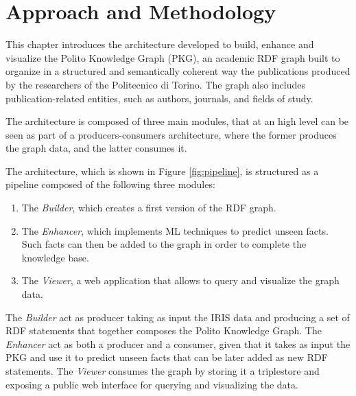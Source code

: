 \documentclass[%
    corpo=13.5pt,
    twoside,
    oldstyle,
    tipotesi=magistrale,
    greek,
    evenboxes
]{toptesi}
\begin{document}
\chapter{Approach and Methodology}
\label{ch:approach}

This chapter introduces the architecture developed to build, enhance
and visualize the Polito Knowledge Graph (PKG), an academic RDF graph
built to organize in a structured and semantically coherent way the publications
produced by the researchers of the Politecnico di Torino. The graph
also includes publication-related entities, such as authors, journals,
and fields of study.

The architecture is composed of three main modules, that at an high level
can be seen as part of a producers-consumers architecture, where the former
produces the graph data, and the latter consumes it.

The architecture, which is shown in Figure \ref{fig:pipeline}, is structured
as a pipeline composed of the following three modules:

\begin{enumerate}
    \item The \emph{Builder}, which creates a first version of the
    RDF graph.
    \item The \emph{Enhancer}, which implements ML techniques to predict
    unseen facts. Such facts can then be added to the graph in order to
    complete the knowledge base.
    \item The \emph{Viewer}, a web application that allows to query
    and visualize the graph data.
\end{enumerate}

The \emph{Builder} act as producer taking as input the IRIS data
and producing a set of RDF statements that together composes the
Polito Knowledge Graph.
The \emph{Enhancer} act as both a producer and a consumer, given that it
takes as input the PKG and use it to predict unseen facts that can be
later added as new RDF statements.
The \emph{Viewer} consumes the graph by storing it a triplestore and exposing
a public web interface for querying and visualizing the data.
\newline
\newline
\end{document}
